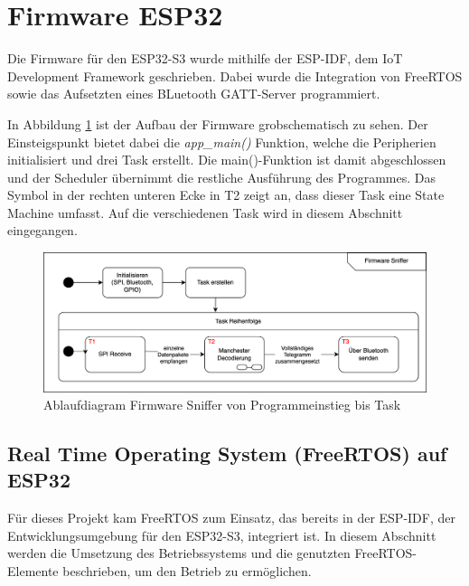 

\section{Firmware ESP32}

Die Firmware für den ESP32-S3 wurde mithilfe der ESP-IDF, dem IoT Development Framework geschrieben. Dabei wurde die Integration von FreeRTOS sowie das Aufsetzten eines BLuetooth GATT-Server programmiert. 

In Abbildung \ref{fig:FSMEinleitung} ist der Aufbau der Firmware grobschematisch zu sehen. Der Einsteigspunkt bietet dabei die \textit{app\_main()} Funktion, welche die Peripherien initialisiert und drei Task erstellt. Die main()-Funktion ist damit abgeschlossen und der Scheduler übernimmt die restliche Ausführung des Programmes. Das Symbol in der rechten unteren Ecke in T2 zeigt an, dass dieser Task eine State Machine umfasst. Auf die verschiedenen Task wird in diesem Abschnitt eingegangen.

\begin{figure}[H]
    \centering
    \includegraphics[width=0.9\linewidth]{Figures/Chap3/ESP/Einleitung/FSM_Einleitung.png}
    \caption{Ablaufdiagram Firmware Sniffer von Programmeinstieg bis Task}
    \label{fig:FSMEinleitung}
\end{figure}

\subsection{Real Time Operating System (FreeRTOS) auf ESP32}


Für dieses Projekt kam FreeRTOS zum Einsatz, das bereits in der ESP-IDF, der Entwicklungsumgebung für den ESP32-S3, integriert ist. \cite{FREERTOS_IDF_API} In diesem Abschnitt werden die Umsetzung des Betriebssystems und die genutzten FreeRTOS-Elemente beschrieben, um den Betrieb zu ermöglichen.


